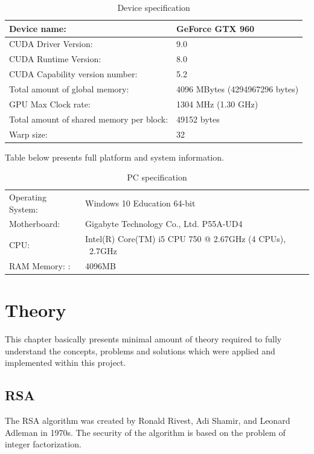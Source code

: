 \documentclass[oneside,openright,12pt,final,en]{mgr}
\begin{document}
\begin{table}[!h]
	\caption{Device specification}
	\label{dspec}
	\centering
	\begin{tabular}{ | l | l |}
		\hline
		Device name: & GeForce GTX 960 \\ \hline
		CUDA Driver Version: & 9.0 \\
		CUDA Runtime Version: & 8.0  \\
		CUDA Capability version number: & 5.2  \\ 
		Total amount of global memory: & 4096 MBytes (4294967296 bytes)  \\
    	GPU Max Clock rate:  & 1304 MHz (1.30 GHz)  \\
		Total amount of shared memory per block: & 49152 bytes  \\
		Warp size: & 32  \\\hline
	\end{tabular}
\end{table}
 
 Table below presents full platform and system information.
 
 \begin{table}[h]
 	\caption{PC specification}
 	\label{pspec}
 	\centering
 	\begin{tabular}{ | l | l |}
 		\hline
 		Operating System: & Windows 10 Education 64-bit \\
 		Motherboard: & Gigabyte Technology Co., Ltd. P55A-UD4 \\
 		CPU: & Intel(R) Core(TM) i5 CPU 750  @ 2.67GHz (4 CPUs), ~2.7GHz  \\
 		RAM Memory: : & 4096MB \\\hline
 	\end{tabular}
 \end{table}


\chapter{Theory}
This chapter basically presents minimal amount of theory required to fully understand the concepts, problems and solutions which were applied and implemented within this project.

\section{RSA}

The RSA algorithm was created by Ronald Rivest, Adi Shamir, and Leonard Adleman in 1970s.
The security of the algorithm is based on the problem of integer factorization.
\end{document}
